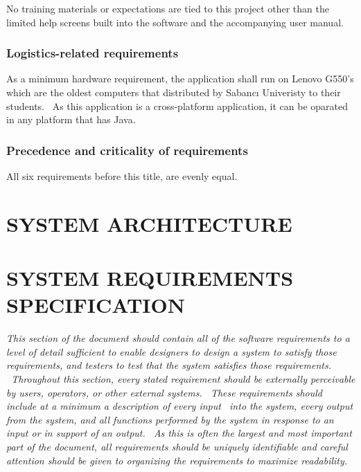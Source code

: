 \documentclass[twoside,letterpaper]{article}
\begin{document}
{\color{black}
No training materials or expectations are tied to this project other
than the limited help screens built into the software and the
accompanying user manual.}

\subsubsection[Logistics{}-related
requirements]{\rmfamily\bfseries\color{black}
Logistics-related requirements}

{\color{black}
As a minimum hardware requirement, the application shall run on Lenovo G550{\textquoteright}s which are the oldest computers that distributed by Sabanc\i{} Univeristy to their students. \ As this application is a cross-platform application, it can be oparated in any platform that has Java.}

\subsubsection[Precedence and criticality of
requirements]{\rmfamily\bfseries\color{black}
Precedence and criticality of requirements}

{\color{black}
All six requirements before this title, are evenly equal.}

\clearpage\section[SYSTEM ARCHITECTURE]{\rmfamily\bfseries\color{black}
SYSTEM ARCHITECTURE}
\clearpage\section[SYSTEM REQUIREMENTS SPECIFICATION]{\rmfamily\bfseries\color{black}
SYSTEM REQUIREMENTS SPECIFICATION}
{\itshape\color{black}
This section of the document should contain all of the software
requirements to a level of detail sufficient to enable designers to
design a system to satisfy those requirements, and testers to test that
the system satisfies those requirements. \ Throughout this section,
every stated requirement should be externally perceivable by users,
operators, or other external systems. \ These requirements should
include at a minimum a description of every input \ into the system,
every output from the system, and all functions performed by the system
in response to an input or in support of an output. \ As this is often
the largest and most important part of the document, all requirements
should be uniquely identifiable and careful attention should be given
to organizing the requirements to maximize readability.}
\end{document}
